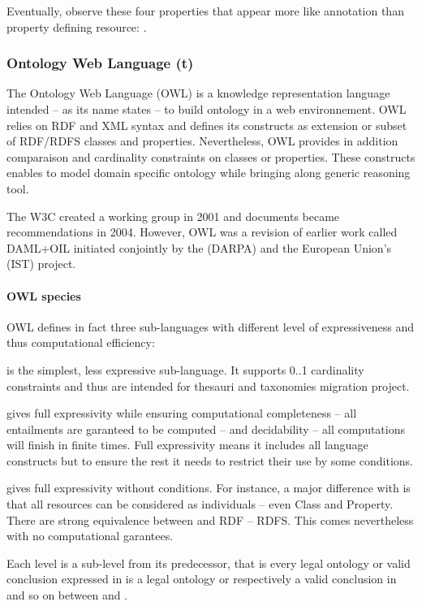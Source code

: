 Eventually, observe these four properties that appear more like annotation than property defining resource: .





\subsubsection{Ontology Web Language (t)}
The Ontology Web Language (OWL) is a knowledge representation language intended – as its name states – to build ontology in a web environnement. 
OWL relies on RDF and XML syntax and defines its constructs as extension or subset of RDF/RDFS classes and properties. 
Nevertheless, OWL provides in addition comparaison and cardinality constraints on classes or properties. 
These constructs enables to model domain specific ontology while bringing along generic reasoning tool. 

The W3C created a working group in 2001 and documents became recommendations in 2004.
However, OWL was a revision of earlier work called DAML+OIL initiated conjointly by the  (DARPA) and the European Union's  (IST) project. 

\paragraph{OWL species}
OWL defines in fact three sub-languages with different level of expressiveness and thus computational efficiency:
\begin{liste}
	\item {} is the simplest, less expressive sub-language. 
	It supports 0..1 cardinality constraints and thus are intended for thesauri and taxonomies migration project.

	\item {} gives full expressivity while ensuring computational completeness – all entailments are garanteed to be computed – and decidability – all computations will finish in finite times. 
	Full expressivity means it includes all language constructs but to ensure the rest it needs to restrict their use by some conditions. 

	\item {} gives full expressivity without conditions. For instance, a major difference with  is that all resources can be considered as individuals – even Class and Property. 
	There are strong equivalence between  and RDF – RDFS. This comes nevertheless with no computational garantees. 
\end{liste}
Each level is a sub-level from its predecessor, that is every legal ontology or valid conclusion expressed in  is a legal ontology or respectively a valid conclusion in  and so on between  and . 

